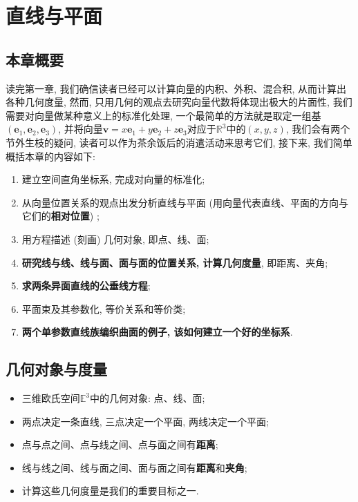 \documentclass[./main.tex]{subfiles}
\begin{document}
\chapter{直线与平面}
\section{本章概要}
读完第一章, 我们确信读者已经可以计算向量的内积、外积、混合积, 从而计算出各种几何度量, 然而, 只用几何的观点去研究向量代数将体现出极大的片面性, 我们需要对向量做某种意义上的标准化处理, 一个最简单的方法就是取定一组基$(\mathbf{e}_1,\mathbf{e}_2,\mathbf{e}_3)$, 并将向量$\mathbf{v}=x\mathbf{e}_1+y\mathbf{e}_2+z\mathbf{e}_3$对应于$\mathbb{R}^3$中的$(x,y,z)$, 我们会有两个节外生枝的疑问, 读者可以作为茶余饭后的消遣活动来思考它们, 接下来, 我们简单概括本章的内容如下: 
\begin{enumerate}
\item 建立空间直角坐标系, 完成对向量的标准化; 
\item 从向量位置关系的观点出发分析直线与平面 (用向量代表直线、平面的方向与它们的\textbf{相对位置}) ; 
\item 用方程描述 (刻画) 几何对象, 即点、线、面; 
\item \textbf{研究线与线、线与面、面与面的位置关系, 计算几何度量}, 即距离、夹角; 
\item \textbf{求两条异面直线的公垂线方程}; 
\item 平面束及其参数化, 等价关系和等价类; 
\item \textbf{两个单参数直线族编织曲面的例子, 该如何建立一个好的坐标系}.
\end{enumerate}

\section{几何对象与度量}
\begin{itemize}
    \item 三维欧氏空间$\mathbb{E}^3$中的几何对象: 点、线、面; 
    \item 两点决定一条直线, 三点决定一个平面, 两线决定一个平面; 
    \item 点与点之间、点与线之间、点与面之间有\textbf{距离}; 
    \item 线与线之间、线与面之间、面与面之间有\textbf{距离}和\textbf{夹角}; 
    \item 计算这些几何度量是我们的重要目标之一.
\end{itemize}
\end{document}
